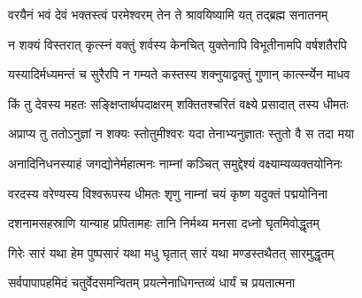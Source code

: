 \twolineshloka
{वरयैनं भवं देवं भक्तस्त्वं परमेश्वरम्}
{तेन ते श्रावयिष्यामि यत् तद्‌ब्रह्म सनातनम्}%

\twolineshloka
{न शक्यं विस्तरात् कृत्स्नं वक्तुं शर्वस्य केनचित्}
{युक्तेनापि विभूतीनामपि वर्षशतैरपि}%

\twolineshloka
{यस्यादिर्मध्यमन्तं च सुरैरपि न गम्यते}
{कस्तस्य शक्नुयाद्वक्तुं गुणान् कार्त्स्न्येन माधव}%

\twolineshloka
{किं तु देवस्य महतः सङ्क्षिप्तार्थपदाक्षरम्}
{शक्तितश्चरितं वक्ष्ये प्रसादात् तस्य धीमतः}%

\twolineshloka
{अप्राप्य तु ततोऽनुज्ञां न शक्यः स्तोतुमीश्वरः}
{यदा तेनाभ्यनुज्ञातः स्तुतो वै स तदा मया}%

\twolineshloka
{अनादिनिधनस्याहं जगद्योनेर्महात्मनः}
{नाम्नां कञ्चित् समुद्देश्यं वक्ष्याम्यव्यक्तयोनिनः}%

\twolineshloka
{वरदस्य वरेण्यस्य विश्वरूपस्य धीमतः}
{शृणु नाम्नां चयं कृष्ण यदुक्तं पद्मयोनिना}%

\twolineshloka
{दशनामसहस्राणि यान्याह प्रपितामहः}
{तानि निर्मथ्य मनसा दध्नो घृतमिवोद्धृतम्}%

\twolineshloka
{गिरेः सारं यथा हेम पुष्पसारं यथा मधु}
{घृतात् सारं यथा मण्डस्तथैतत् सारमुद्धृतम्}%

\twolineshloka
{सर्वपापापहमिदं चतुर्वेदसमन्वितम्}
{प्रयत्नेनाधिगन्तव्यं धार्यं च प्रयतात्मना}%


